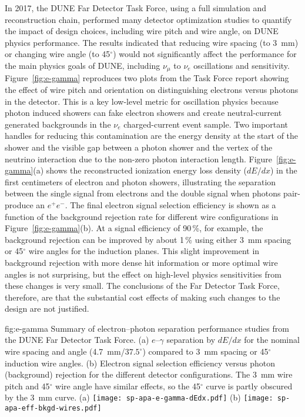 \begin{itemize}
In 2017, the DUNE Far Detector Task Force, using a full  simulation and reconstruction chain, performed many detector optimization studies to quantify the impact of design choices, including wire pitch and wire angle, on DUNE physics performance.  The results indicated that reducing wire spacing (to \SI{3}{mm}) or changing wire angle (to \num{45}$^\circ$) would not significantly affect the performance for the main physics goals of DUNE, including $\nu_\mu $ to $\nu_e$ oscillations and  sensitivity.  Figure~\ref{fig:e-gamma} reproduces two plots from the Task Force report showing the effect of wire pitch and orientation on distinguishing electrons versus photons in the detector.  This is a key low-level metric for oscillation physics because photon induced showers can fake electron showers and create neutral-current generated backgrounds in the $\nu_e$ charged-current event sample. Two important handles for reducing this contamination are the energy density at the start of the shower and the visible gap between a photon shower and the vertex of the neutrino interaction due to the non-zero photon interaction length.  Figure~\ref{fig:e-gamma}(a) shows the reconstructed ionization energy loss density ($dE/dx$) in the first centimeters of electron and photon showers, illustrating the separation between the single  signal from electrons and the double  signal when photons pair-produce an $e^+e^-$.  The final electron signal selection efficiency is shown as a function of the background rejection rate for different wire configurations in Figure~\ref{fig:e-gamma}(b). At a signal efficiency of \num{90}\,\%, for example, the background rejection can be improved by about \num{1}\,\% using either \SI{3}{mm} spacing or 45$^\circ$ wire angles for the induction planes.  This slight improvement in background rejection with more dense hit information or more optimal wire angles is not surprising, but the effect on high-level physics sensitivities from these changes is very small. The conclusions of the Far Detector Task Force, therefore, are that the substantial cost effects of making such changes to the  design are not justified.    

\begin{dunefigure}{fig:e-gamma}
{Summary of electron--photon separation performance studies from the DUNE Far Detector Task Force. (a) $e$--$\gamma$ separation by $dE/dx$ for the nominal wire spacing and angle (\SI{4.7}{mm}/$37.5^\circ$) compared to \SI{3}{mm} spacing or 45$^\circ$ induction wire angles. (b) Electron signal selection efficiency versus photon (background) rejection for the different detector configurations. The \SI{3}{mm} wire pitch and 45$^\circ$ wire angle have similar effects, so the 45$^\circ$ curve is partly obscured by the \SI{3}{mm} curve.}
(a)
\texttt{[image: sp-apa-e-gamma-dEdx.pdf]} \qquad
(b)
\texttt{[image: sp-apa-eff-bkgd-wires.pdf]} 
\end{dunefigure}


\end{itemize}
